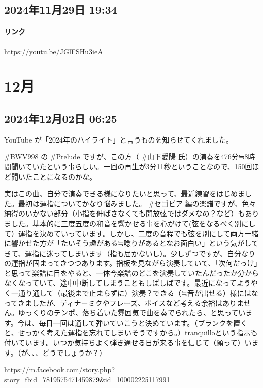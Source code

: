 \subsection*{2024年11月29日 19:34}

\paragraph{リンク}
\url{https://youtu.be/JGlFSHu3ieA}

\section{12月}

\subsection*{2024年12月02日 06:25}

YouTube が「2024年のハイライト」と言うものを知らせてくれました。

\#BWV998 の \#Prelude ですが、この方（ \#山下愛陽 氏）の演奏を476分≒8時間聞いていたという事らしい。一回の再生が3分11秒ということなので、150回ほど聞いたことになるのかな。

実はこの曲、自分で演奏できる様になりたいと思って、最近練習をはじめました。最初は運指についてかなり悩みました。 \#セゴビア 編の楽譜ですが、色々納得のいかない部分（小指を伸ばさなくても開放弦ではダメなの？など）もありました。基本的に三度五度の和音を響かせる事を心がけて(弦をなるべく別にして）運指を決めていっています。しかし、二度の音程でも弦を別にして両方一緒に響かせた方が「たいそう趣がある≒唸りがあるとなお面白い」という気がしてきて、運指に迷ってしまいます（指も届かないし）。少しずつですが、自分なりの運指が固まってきつつあります。指板を見ながら演奏していて、「次何だっけ」と思って楽譜に目をやると、一体今楽譜のどこを演奏していたんだったか分からなくなっていて、途中中断してしまうこともしばしばです。最近になってようやく一通り通して（最後まで止まらずに）演奏？できる（≒音が出せる）様にはなってきましたが、ディナーミクやフレーズ、ボイスなど考える余裕はありません。ゆっくりのテンポ、落ち着いた雰囲気で曲を奏でられたら、と思っています。今は、毎日一回は通して弾いていこうと決めています。（ブランクを置くと、せっかく考えた運指を忘れてしまいそうですから。）tranquilloという指示も付いています。いつか気持ちよく弾き通せる日が来る事を信じて（願って）います。（が、、、どうでしょうか？）

\url{https://m.facebook.com/story.php?story_fbid=7819575471459879&id=100002225117991}

